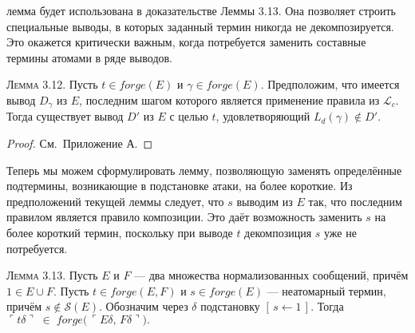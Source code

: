 \noindent лемма будет использована в доказательстве Леммы 3.13.
Она позволяет строить специальные выводы, в которых заданный термин
никогда не декомпозируется. Это окажется критически важным,
когда потребуется заменить составные термины атомами в ряде выводов.

\textsc{Лемма 3.12.}
Пусть $t\in forge(E)$ и $\gamma\in forge(E)$.
Предположим, что имеется вывод $D_{\gamma}$ из $E$,
последним шагом которого является применение правила из $\mathcal L_{c}$.
Тогда существует вывод $D'$ из $E$ с целью $t$, удовлетворяющий
\(
  L_{d}(\gamma)\notin D'.
\)

\begin{proof} См.\ Приложение А.\end{proof}

\medskip

Теперь мы можем сформулировать лемму, позволяющую
заменять определённые подтермины, возникающие в подстановке атаки,
на более короткие.
Из предположений текущей леммы следует, что
$s$ выводим из $E$ так, что последним правилом является правило композиции.
Это даёт возможность заменить $s$ на более короткий термин,
поскольку при выводе $t$ декомпозиция $s$ уже не потребуется.

\textsc{Лемма 3.13.}
Пусть $E$ и $F$ — два множества нормализованных сообщений, причём
$1\in E\cup F$.
Пусть
$t\in forge(E,F)$ и
$s\in forge(E)$ — неатомарный термин, причём $s\notin \mathcal S(E)$.
Обозначим через $\delta$ подстановку $[\,s\!\leftarrow\!1\,]$.
Тогда
\(
  \ulcorner t\delta\urcorner\;\in\;
   forge\!\bigl(\,\ulcorner E\delta,\,F\delta\urcorner\bigr).
\)

